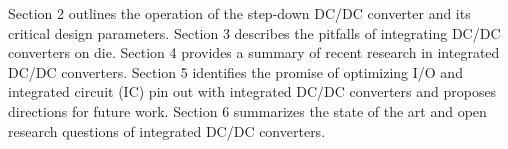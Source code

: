 \documentclass[letterpaper,twocolumn,10pt]{article}
\begin{document}

Section 2 outlines the operation of the step-down DC/DC converter and its critical design parameters. Section 3 describes the pitfalls of integrating DC/DC converters on die. Section 4 provides a summary of recent research in integrated DC/DC converters. Section 5 identifies the promise of optimizing I/O and integrated circuit (IC) pin out with integrated DC/DC converters and proposes directions for future work. Section 6 summarizes the state of the art and open research questions of integrated DC/DC converters.
\end{document}
